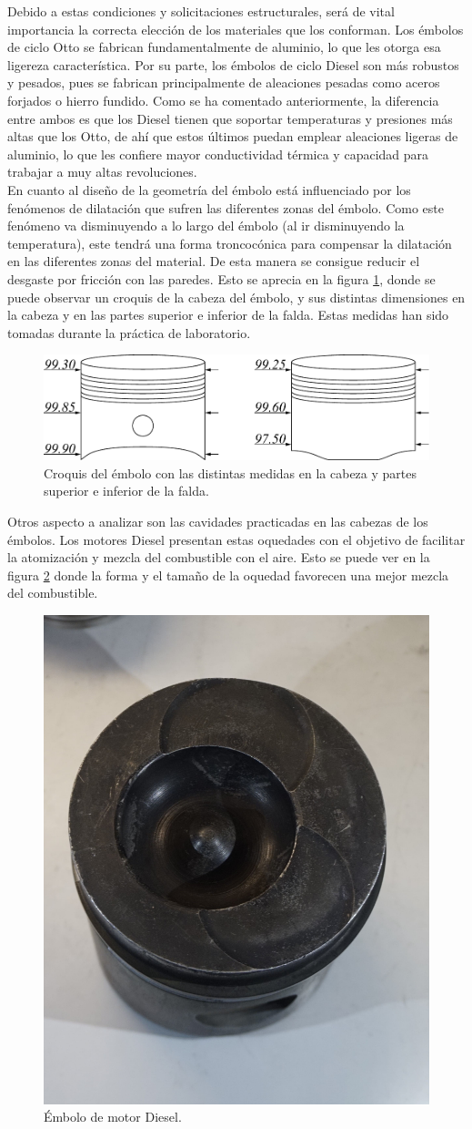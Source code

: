 Debido a estas condiciones y solicitaciones estructurales, será de vital importancia la correcta elección de los materiales que los conforman. Los émbolos de ciclo Otto se fabrican fundamentalmente de aluminio, lo que les otorga esa ligereza característica. Por su parte, los émbolos de ciclo Diesel son más robustos y pesados, pues se fabrican principalmente de aleaciones pesadas como aceros forjados o hierro fundido. Como se ha comentado anteriormente, la diferencia entre ambos es que los Diesel tienen que soportar temperaturas y presiones más altas que los Otto, de ahí que estos últimos puedan emplear aleaciones ligeras de aluminio, lo que les confiere mayor conductividad térmica y capacidad para trabajar a muy altas revoluciones.\\

En cuanto al diseño de la geometría del émbolo está influenciado por los fenómenos de dilatación que sufren las diferentes zonas del émbolo. Como este fenómeno va disminuyendo a lo largo del émbolo (al ir disminuyendo la temperatura), este tendrá una forma troncocónica para compensar la dilatación en las diferentes zonas del material. De esta manera se consigue reducir el desgaste por fricción con las paredes. Esto se aprecia en la figura \ref{fig:emb_croq}, donde se puede observar un croquis de la cabeza del émbolo, y sus distintas dimensiones en la cabeza y en las partes superior e inferior de la falda. Estas medidas han sido tomadas durante la práctica de laboratorio.

\begin{figure}[H]
	\centering
	\includegraphics[width=0.6\linewidth]{Figures/01/m1/croq_3.pdf}
	\caption{Croquis del émbolo con las distintas medidas en la cabeza y partes superior e inferior de la falda.}
	\label{fig:emb_croq}
\end{figure}

Otros aspecto a analizar son las cavidades practicadas en las cabezas de los émbolos. Los motores Diesel presentan estas oquedades con el objetivo de facilitar la atomización y mezcla del combustible con el aire. Esto se puede ver en la figura \ref{fig:emb_diesel} donde la forma y el tamaño de la oquedad favorecen una mejor mezcla del combustible.

\begin{figure}[H]
	\centering
	\includegraphics[width=0.275\linewidth]{Figures/01/m1/cil_diesel.jpg}
	\caption{Émbolo de motor Diesel.}
	\label{fig:emb_diesel}
\end{figure}

